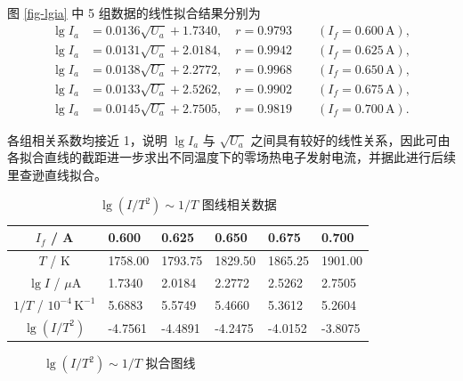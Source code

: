 \documentclass{../template/myrpt}
\begin{document}
图 \ref{fig-lgia} 中 5 组数据的线性拟合结果分别为
\[
\begin{aligned}
\lg I_a &= 0.0136\sqrt{U_a} + 1.7340,\quad r = 0.9793 \qquad (I_f=0.600\,\mathrm{A}), \\
\lg I_a &= 0.0131\sqrt{U_a} + 2.0184,\quad r = 0.9942 \qquad (I_f=0.625\,\mathrm{A}), \\
\lg I_a &= 0.0138\sqrt{U_a} + 2.2772,\quad r = 0.9968 \qquad (I_f=0.650\,\mathrm{A}), \\
\lg I_a &= 0.0133\sqrt{U_a} + 2.5262,\quad r = 0.9902 \qquad (I_f=0.675\,\mathrm{A}), \\
\lg I_a &= 0.0145\sqrt{U_a} + 2.7505,\quad r = 0.9819 \qquad (I_f=0.700\,\mathrm{A}).
\end{aligned}
\]

各组相关系数均接近 1，说明 $\lg I_a$ 与 $\sqrt{U_a}$ 之间具有较好的线性关系，因此可由各拟合直线的截距进一步求出不同温度下的零场热电子发射电流，并据此进行后续里查逊直线拟合。

\begin{table}[htbp]
  \centering
  \caption{$\lg(I/T^2)\sim 1/T$ 图线相关数据}
  \label{table2}
  \begin{tabularx}{\textwidth}{c *{5}{Y}}
    \toprule
    $I_f$ / A & 0.600 & 0.625 & 0.650 & 0.675 & 0.700 \\
    \midrule
    $T$ / K & 1758.00 & 1793.75 & 1829.50 & 1865.25 & 1901.00 \\
    $\lg I$ / $\mu$A & 1.7340 & 2.0184 & 2.2772 & 2.5262 & 2.7505 \\
    $1/T$ / $10^{-4}\,\mathrm{K}^{-1}$ & 5.6883 & 5.5749 & 5.4660 & 5.3612 & 5.2604 \\
    $\lg(I/T^2)$ & -4.7561 & -4.4891 & -4.2475 & -4.0152 & -3.8075 \\
    \bottomrule
  \end{tabularx}
\end{table}

\begin{figure}[htbp]
  \centering
  \caption{$\lg(I/T^2)\sim 1/T$ 拟合图线}
  \label{fig-richardson}
\end{figure}
\end{document}
